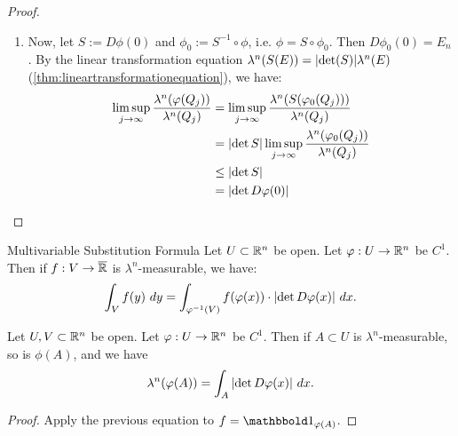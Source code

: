 \begin{proof}
\begin{enumerate}
		\begin{align*}
			\frac{\lambda^n(\phi(Q_j))}{\lambda^n(Q_j)}
			\leq (1 + 4\epsilon)^n
		\end{align*}
		Letting $j \to \infty$ and $\epsilon \searrow 0$, we have
		\begin{align*}
			\limsup_{j \to \infty }\frac{\lambda^n(\phi(Q_j))}{\lambda^n(Q_j)}
			&\leq \lim_{\epsilon \to 0} (1 + 4\abs{\epsilon})^n\\
			&= 1\\
			&= \abs{\det E_n}
		\end{align*}
		\item Now, let $S := D\phi(0)$ and $\phi_0 := S^{-1} \circ \phi$, i.e. $\phi = S \circ \phi_0$. Then $D\phi_0(0) = E_n$. By the linear transformation equation $\lambda^n(S(E)) = \abs{\det(S)} \lambda^n(E)$ (\ref{thm:lineartransformationequation}), we have:
		\begin{align*}
			\limsup_{j \to \infty} \frac{\lambda^n(\varphi(Q_j))}{\lambda^n(Q_j)}
			&=
			\limsup_{j \to \infty} \frac{\lambda^n(S(\varphi_0(Q_j)))}{\lambda^n(Q_j)}\\
			&= \abs{\det S} \limsup_{j \to \infty} \frac{\lambda^n(\varphi_0(Q_j))}{\lambda^n(Q_j)}\\
			&\leq \abs{\det S}\\
			&= \abs{\det D\varphi(0)}
		\end{align*}
	\end{enumerate}
\end{proof}
\begin{importanttheorem}{Multivariable Substitution Formula}{}
	Let $U \subset \mathbb{R}^n$ be open. Let $\varphi : U \to \mathbb{R}^n$ be $C^1$. Then if $f : V \to \overline{{\mathbb{R}}}$ is $\lambda^n$-measurable, we have:
	\begin{align*}
		\int_V f(y) ~dy = \int_{\varphi^{-1}(V)} f(\varphi(x)) \cdot \abs{\det D\varphi(x)} ~dx.
	\end{align*}
\end{importanttheorem}
\begin{importantcorollary}{}{}
	Let $U,V \subset \mathbb{R}^n$ be open. Let $\varphi : U \to \mathbb{R}^n$ be $C^1$. Then if $A \subset U$ is $\lambda^n$-measurable, so is $\phi(A)$, and we have
	\begin{align*}
		\lambda^n(\varphi(A)) = \int_A \abs{\det D\varphi(x)} ~dx.
	\end{align*}
\end{importantcorollary}
\begin{proof}
	Apply the previous equation to $f = \boldone_{\phi(A)}$.
\end{proof}
